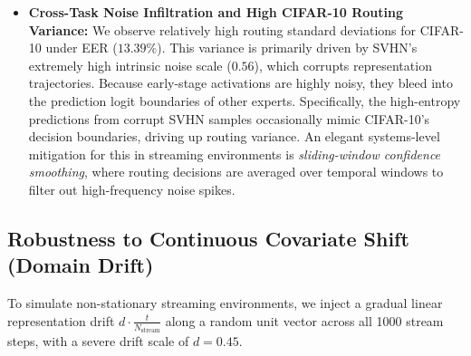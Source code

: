 \begin{itemize}
    \item \textbf{Cross-Task Noise Infiltration and High CIFAR-10 Routing Variance:} We observe relatively high routing standard deviations for CIFAR-10 under EER ($13.39\%$). This variance is primarily driven by SVHN's extremely high intrinsic noise scale ($0.56$), which corrupts representation trajectories. Because early-stage activations are highly noisy, they bleed into the prediction logit boundaries of other experts. Specifically, the high-entropy predictions from corrupt SVHN samples occasionally mimic CIFAR-10's decision boundaries, driving up routing variance. An elegant systems-level mitigation for this in streaming environments is \emph{sliding-window confidence smoothing}, where routing decisions are averaged over temporal windows to filter out high-frequency noise spikes.
\end{itemize}

\subsection{Robustness to Continuous Covariate Shift (Domain Drift)}
To simulate non-stationary streaming environments, we inject a gradual linear representation drift $d \cdot \frac{t}{N_{\text{stream}}}$ along a random unit vector across all 1000 stream steps, with a severe drift scale of $d = 0.45$.

